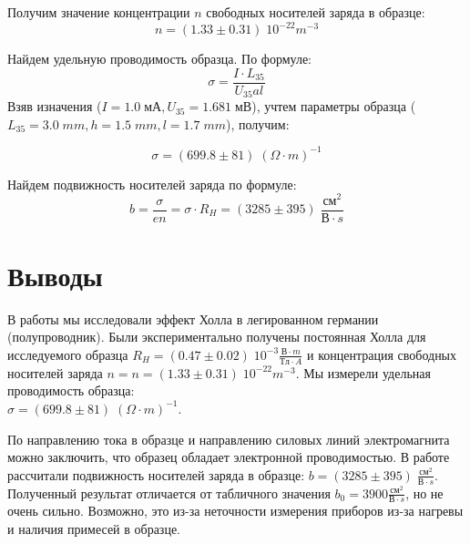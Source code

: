 \documentclass[11pt]{article}
\begin{document}
Получим значение концентрации \(n\) свободных носителей заряда в образце:
\[ n = (1.33 \pm 0.31)\; 10^{-22}m^{-3} \]

Найдем удельную проводимость образца. По формуле:
\[ \sigma = \frac{I\cdot L_{35}}{U_{35}al} \]
Взяв изначения (\( I = 1.0\; мА, U_{35} = 1.681\; мВ \)), учтем параметры образца (\(L_{35} = 3.0\; mm, h = 1.5\; mm, l = 1.7\; mm\)), получим:

\[ \sigma = (699.8 \pm 81)\; (\Omega\cdot m)^{-1} \]

Найдем подвижность носителей заряда по формуле:
\[ b = \frac{\sigma}{en} = \sigma\cdot R_H = (3285 \pm 395)\; \frac{см^2}{В\cdot s} \]

\section{Выводы}

В работы мы исследовали эффект Холла в легированном германии (полупроводник). Были экспериментально получены постоянная Холла для исследуемого образца
\( R_H = (0.47 \pm 0.02)\; 10^{-3} \frac{В\cdot m}{Тл\cdot A} \) и концентрация свободных носителей заряда
\( n = n = (1.33 \pm 0.31)\; 10^{-22}m^{-3} \). Мы измерели удельная проводимость образца: \\
\( \sigma = (699.8 \pm 81)\; (\Omega\cdot m)^{-1} \).
    
По направлению тока в образце и направлению силовых линий электромагнита можно заключить, что
образец обладает электронной проводимостью. В работе рассчитали подвижность носителей заряда в образце:
\( b = (3285 \pm 395)\; \frac{см^2}{В\cdot s} \). Полученный результат отличается от табличного значения
\( b_0 = 3900 \frac{см^2}{В\cdot s} \), но не очень сильно. Возможно, это из-за неточности измерения приборов из-за нагревы и наличия примесей в образце.
\end{document}
